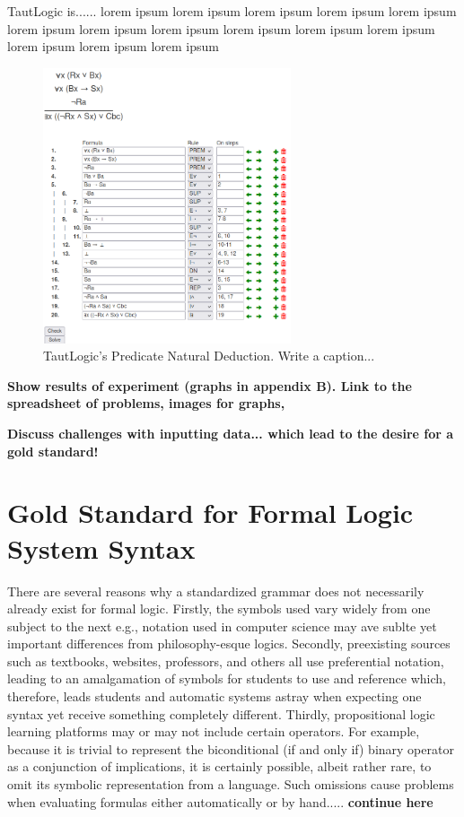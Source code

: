 \documentclass[ms]{uncgdissertationexp2}
\theoremstyle{plain}
\theoremstyle{definition}
\theoremstyle{remark}
\newcommand{\titlecaption}[2]{\caption[#1]{#1. #2}}
\begin{document}
    TautLogic is...... lorem ipsum  lorem ipsum lorem ipsum lorem ipsum lorem ipsum lorem ipsum lorem ipsum lorem ipsum lorem ipsum lorem ipsum lorem ipsum lorem ipsum lorem ipsum lorem ipsum
    \begin{figure}
        \centering
        \includegraphics[width=0.65\textwidth]{tautlogic.png}
        \titlecaption{TautLogic's Predicate Natural Deduction}{Write a caption...}
        \label{fig:tautlogic}
    \end{figure} 

    \textbf{Show results of experiment (graphs in appendix B). Link to the spreadsheet of problems, images for graphs, }

    \textbf{Discuss challenges with inputting data... which lead to the desire for a gold standard!}    

    \section{Gold Standard for Formal Logic System Syntax}
    There are several reasons why a standardized grammar does not necessarily already exist for formal logic. Firstly, the symbols used vary widely from one subject to the next e.g., notation used in computer science may ave sublte yet important differences from philosophy-esque logics. Secondly, preexisting sources such as textbooks, websites, professors, and others all use preferential notation, leading to an amalgamation of symbols for students to use and reference which, therefore, leads students and automatic systems astray when expecting one syntax yet receive something completely different. Thirdly, propositional logic learning platforms may or may not include certain operators. For example, because it is trivial to represent the biconditional (if and only if) binary operator as a conjunction of implications, it is certainly possible, albeit rather rare, to omit its symbolic representation from a language. Such omissions cause problems when evaluating formulas either automatically or by hand..... \textbf{continue here}
\end{document}
